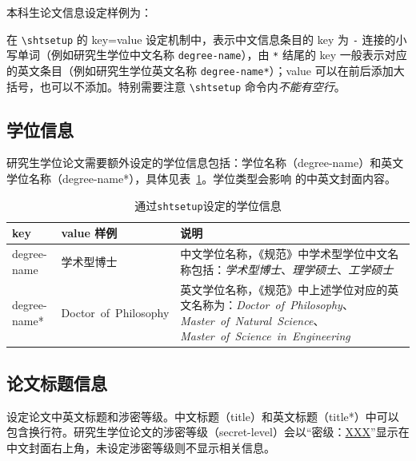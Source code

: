 \documentclass[master]{shtthesis}
\begin{document}
本科生论文信息设定样例为：
\begin{latex}
\end{latex}

在 \verb|\shtsetup| 的 key=value 设定机制中，表示中文信息条目的 key 为 \verb|-| 连接的小写单词（例如研究生学位中文名称 \verb|degree-name|），由 \verb|*| 结尾的 key 一般表示对应的英文条目（例如研究生学位英文名称 \verb|degree-name*|）；value 可以在前后添加大括号，也可以不添加。特别需要注意 \verb|\shtsetup| 命令内\emph{不能有空行}。

\subsection{学位信息}
研究生学位论文需要额外设定的学位信息包括：学位名称（degree-name）和英文学位名称（degree-name*），具体见表~\ref{tab::degree_info}。学位类型会影响 \shtthesis{} 的中英文封面内容。
\begin{table}[htb]
\centering
\caption{通过\texttt{shtsetup}设定的学位信息} \label{tab::degree_info}
\begin{tabular}{llp{}}
  \toprule
  key & value 样例 & 说明 \\
  \midrule
  degree-name & 学术型博士 & 中文学位名称，《规范》中学术型学位中文名称包括：\emph{学术型博士}、\emph{理学硕士}、\emph{工学硕士} \\
  degree-name* & Doctor~of~Philosophy & 英文学位名称，《规范》中上述学位对应的英文名称为：\emph{Doctor~of~Philosophy}、\emph{Master~of~Natural~Science}、\emph{Master~of~Science~in~Engineering} \\
  \bottomrule
\end{tabular}
\end{table}

\subsection{论文标题信息}
设定论文中英文标题和涉密等级。中文标题（title）和英文标题（title*）中可以包含换行符。研究生学位论文的涉密等级（secret-level）会以“密级：\uline{XXX}”显示在中文封面右上角，未设定涉密等级则不显示相关信息。
\end{document}
